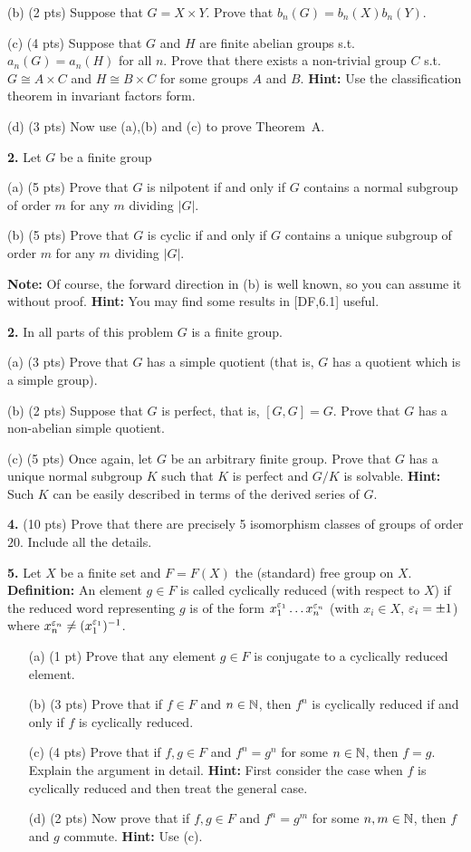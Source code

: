 \documentclass[12pt]{article}
\begin{document}
(b) (2 pts) Suppose that $G=X\times Y$. Prove that $b_n(G)=b_n(X)b_n(Y)$.

(c) (4 pts)  Suppose that $G$ and $H$ are finite abelian groups s.t. $a_n(G)=a_n(H)$ for all $n$. Prove that there exists a non-trivial
group $C$ s.t. $G\cong A\times C$ and $H\cong B\times C$ for some
groups $A$ and $B$. {\bf Hint:} Use the classification theorem in
invariant factors form.
 
(d) (3 pts) Now use (a),(b) and (c) to prove Theorem~A.
\skv
\skv

{\bf 2.} Let $G$ be a finite group

(a) (5 pts) Prove that $G$ is nilpotent if and only if $G$ contains
a normal subgroup of order $m$ for any $m$ dividing $|G|$.

(b) (5 pts) Prove that $G$ is cyclic if and only if $G$ contains
a unique subgroup of order $m$ for any $m$ dividing $|G|$.

{\bf Note:} Of course, the forward direction in (b) is well known,
so you can assume it without proof. {\bf Hint:} You may find
some results in [DF,6.1] useful.
\skv
\skv

{\bf 2.} In all parts of this problem $G$ is a finite group.

(a) (3 pts) Prove that $G$ has a simple quotient (that is, $G$ has a quotient
which is a simple group).

(b) (2 pts) Suppose that $G$ is perfect, that is, $[G,G]=G$. Prove that $G$ has
a non-abelian simple quotient.

(c) (5 pts) Once again, let $G$ be an arbitrary finite group. Prove that $G$
has a unique normal subgroup $K$ such that $K$ is perfect and $G/K$
is solvable. {\bf Hint:} Such $K$ can be easily described in terms of
the derived series of $G$.
\skv
\skv

{\bf 4.} (10 pts) Prove that there are precisely 5 isomorphism classes of groups of order $20$. Include all the details. 
\skv
\skv


{\bf 5.} Let $X$ be a finite set and $F=F(X)$ the (standard) free group on $X$.
\skv
{\bf Definition:} An element $g\in F$ is called cyclically reduced (with respect to $X$) if the reduced word representing $g$ is of the form $x_1^{{\varepsilon}_1}\ldots x_n^{{\varepsilon}_n}$
(with $x_i\in X$, ${\varepsilon}_i=\pm 1$) where $x_n^{{\varepsilon}_n}\neq (x_1^{{\varepsilon}_1})^{-1}$.
\skv
\begin{itemize}
\item[(a)] (1 pt) Prove that any element $g\in F$ is conjugate to a cyclically
reduced element.

\item[(b)] (3 pts) Prove that if $f\in F$ and $n\in{\mathbb N}$, then $f^n$ is cyclically reduced if and only if $f$ is cyclically reduced.

\item[(c)] (4 pts) Prove that if $f,g\in F$ and $f^n=g^n$ for some $n\in{\mathbb N}$, then $f=g$. Explain the argument in detail.
{\bf Hint:} First consider the case when $f$ is cyclically reduced
and then treat the general case. 

\item[(d)] (2 pts) Now prove that if $f,g\in F$ and $f^n=g^m$ for some $n,m\in{\mathbb N}$,
then $f$ and $g$ commute. {\bf Hint:} Use (c).
\end{itemize}
\end{document}

